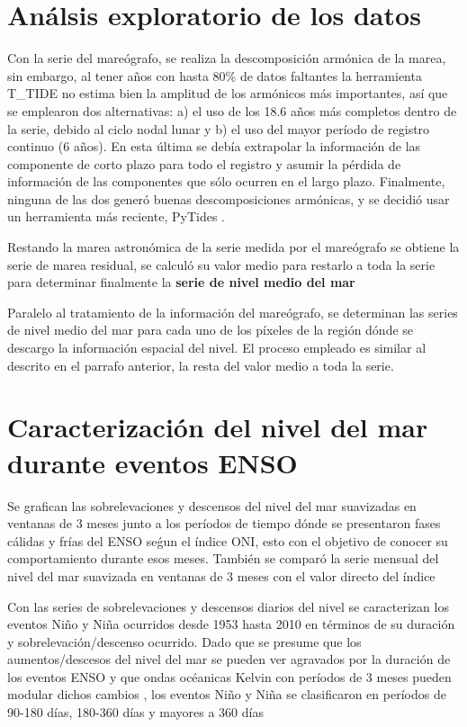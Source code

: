 \section{Análsis exploratorio de los datos}

Con la serie del mareógrafo, se realiza la  descomposición armónica de la marea, sin embargo, al tener años con hasta 80\% de datos faltantes la herramienta T\_TIDE no estima bien la amplitud de los armónicos más importantes, así que se emplearon dos alternativas: a) el uso de los 18.6 años más completos dentro de la serie, debido al ciclo nodal lunar y b) el uso del mayor período de registro continuo (6 años). En esta última se debía extrapolar la información de las componente de corto plazo para todo el registro y asumir la pérdida de información de las componentes que sólo ocurren en el largo plazo. Finalmente, ninguna de las dos generó buenas descomposiciones armónicas, y se decidió usar un herramienta más reciente, PyTides \citep{Schuremann1958}.

Restando la marea astronómica de la serie medida por el mareógrafo se obtiene la serie de marea residual, se calculó su valor medio para restarlo a toda la serie para determinar finalmente la \textbf{serie de nivel medio del mar}

Paralelo al tratamiento de la información del mareógrafo, se determinan las series de nivel medio del mar para cada uno de los píxeles de la región dónde se descargo la información espacial del nivel. El proceso empleado es similar al descrito en el parrafo anterior, la resta del valor medio a toda la serie.

\section{Caracterización del nivel del mar durante eventos ENSO}

Se grafican las sobrelevaciones y descensos del nivel del mar suavizadas en ventanas de 3 meses junto a los períodos de tiempo dónde se presentaron fases cálidas y frías del ENSO seǵun el índice ONI, esto con el objetivo de conocer su comportamiento durante esos meses. También se comparó la serie mensual del nivel del mar suavizada en ventanas de 3 meses con el valor directo del índice

Con las series de sobrelevaciones y descensos diarios del nivel se caracterizan los eventos Niño y Niña ocurridos desde 1953 hasta 2010 en términos de su duración y sobrelevación/descenso ocurrido. Dado que se presume que los aumentos/descesos del nivel del mar se pueden ver agravados por la duración de los eventos ENSO y que ondas océanicas Kelvin con períodos de 3 meses pueden modular dichos cambios \citep{Fedorov2019}, los eventos Niño y Niña se clasificaron en períodos de 90-180 días, 180-360 días y mayores a 360 días 

